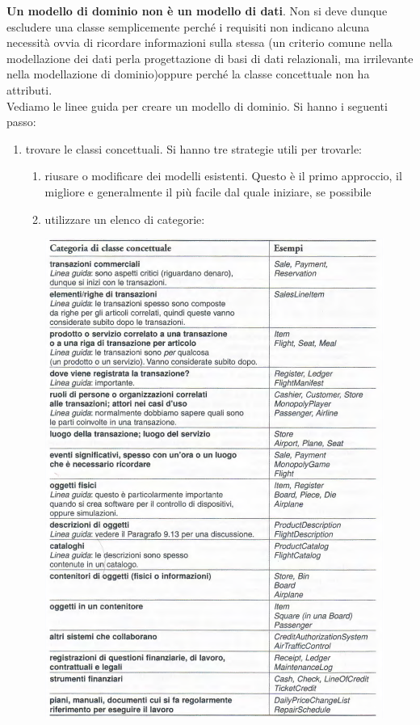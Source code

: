 \documentclass[a4paper,12pt, oneside]{book}
\begin{document}
\textbf{Un modello di dominio non è un modello di dati}. Non si deve dunque escludere una classe semplicemente perché i requisiti non indicano alcuna necessità ovvia di ricordare informazioni sulla stessa (un criterio comune nella modellazione dei dati perla progettazione di basi di dati relazionali, ma irrilevante nella modellazione di dominio)oppure perché la classe concettuale non ha attributi.\\
Vediamo le linee guida per creare un modello di dominio. Si hanno i seguenti passo:
\begin{enumerate}
	\item trovare le classi concettuali. Si hanno tre strategie utili per trovarle:
	\begin{enumerate}
	\item riusare o modificare dei modelli esistenti. Questo è il primo approccio, il migliore e generalmente il più facile dal quale iniziare, se possibile
	\item utilizzare un elenco di categorie:
	\begin{center}
		\includegraphics[scale=0.7]{img/catd.png}
	\end{center}

\end{enumerate}
\end{enumerate}
\end{document}
